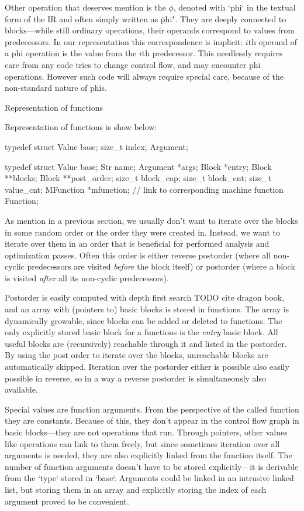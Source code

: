 Other operation that deserves mention is the $\phi$, denoted with `phi` in the
textual form of the IR and often simply written as \"phi". They are deeply
connected to blocks---while still ordinary operations, their operands correspond
to values from predecessors. In our representation this correspondence is
implicit: $i$th operand of a phi operation is the value from the $i$th
predecessor. This needlessly requires care from any code tries to change control
flow, and may encounter phi operations. However such code will always require
special care, because of the non-standard nature of phis. 

\secc Representation of functions

Representation of functions is show below:

\begtt
typedef struct {
	Value base;
	size_t index;
} Argument;

typedef struct {
	Value base;
	Str name;
	Argument *args;
	Block *entry;
	Block **blocks;
	Block **post_order;
	size_t block_cap;
	size_t block_cnt;
	size_t value_cnt;
	MFunction *mfunction; // link to corresponding machine function
} Function;
\endtt

As mention in a previous section, we usually don't want to iterate over the
blocks in some random order or the order they were created in. Instead, we want to
iterate over them in an order that is beneficial for performed analysis and
optimization passes. Often this order is either reverse postorder (where all
non-cyclic predecessors are visited {\em before} the block itself) or postorder
(where a block is visited {\em after} all its non-cyclic predecessors).

Postorder is easily computed with depth first search TODO cite dragon book,
and an array with (pointers to) basic blocks is stored in functions. The array
is dynamically growable, since blocks can be added or deleted to functions. The
only explicitly stored basic block for a functions is the {\em entry} basic
block. All useful blocks are (recursively) reachable through it and listed in
the postorder. By using the post order to iterate over the blocks, unreachable
blocks are automatically skipped. Iteration over the postorder either is
possible also easily possible in reverse, so in a way a reverse postorder is
simultaneously also available.

Special values are function arguments. From the perspective of the called
function they are constants. Because of this, they don't appear in the control
flow graph in basic blocks---they are not operations that run. Through pointers,
other values like operations can link to them freely, but since sometimes
iteration over all arguments is needed, they are also explicitly linked from the
function itself. The number of function arguments doesn't have to be stored
explicitly---it is derivable from the `type` stored in `base`. Arguments could
be linked in an intrusive linked list, but storing them in an array and
explicitly storing the index of each argument proved to be convenient.

